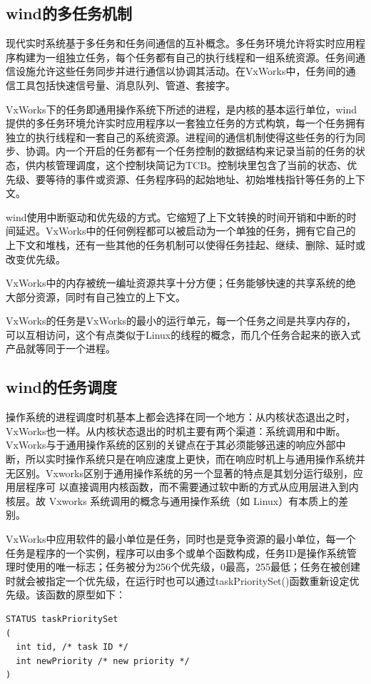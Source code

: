 \subsection{wind的多任务机制}
	现代实时系统基于多任务和任务间通信的互补概念。多任务环境允许将实时应用程序构建为一组独立任务，每个任务都有自己的执行线程和一组系统资源。任务间通信设施允许这些任务同步并进行通信以协调其活动。在VxWorks中，任务间的通信工具包括快速信号量、消息队列、管道、套接字。
	
	VxWorks下的任务即通用操作系统下所述的进程，是内核的基本运行单位，wind提供的多任务环境允许实时应用程序以一套独立任务的方式构筑，每一个任务拥有独立的执行线程和一套自己的系统资源。进程间的通信机制使得这些任务的行为同步、协调。内一个开启的任务都有一个任务控制的数据结构来记录当前的任务的状态，供内核管理调度，这个控制块简记为TCB。控制块里包含了当前的状态、优先级、要等待的事件或资源、任务程序码的起始地址、初始堆栈指针等任务的上下文。
	
	wind使用中断驱动和优先级的方式。它缩短了上下文转换的时间开销和中断的时间延迟。VxWorks中的任何例程都可以被启动为一个单独的任务，拥有它自己的上下文和堆栈，还有一些其他的任务机制可以使得任务挂起、继续、删除、延时或改变优先级。	

	VxWorks中的内存被统一编址资源共享十分方便；任务能够快速的共享系统的绝大部分资源，同时有自己独立的上下文。
	
	VxWorks的任务是VxWorks的最小的运行单元，每一个任务之间是共享内存的，可以互相访问，这个有点类似于Linux的线程的概念，而几个任务合起来的嵌入式产品就等同于一个进程。

\subsection{wind的任务调度}

	操作系统的进程调度时机基本上都会选择在同一个地方：从内核状态退出之时，VxWorks也一样。从内核状态退出的时机主要有两个渠道：系统调用和中断。	VxWorks与于通用操作系统的区别的关键点在于其必须能够迅速的响应外部中断，所以实时操作系统只是在响应速度上更快，而在响应时机上与通用操作系统并无区别。Vxworks区别于通用操作系统的另一个显著的特点是其划分运行级别，应用层程序可
以直接调用内核函数，而不需要通过软中断的方式从应用层进入到内核层。故 Vxworks 系统调用的概念与通用操作系统（如 Linux）有本质上的差别。
	
	
	VxWorks中应用软件的最小单位是任务，同时也是竞争资源的最小单位，每一个任务是程序的一个实例，程序可以由多个或单个函数构成，任务ID是操作系统管理时使用的唯一标志；任务被分为256个优先级，0最高，255最低；任务在被创建时就会被指定一个优先级，在运行时也可以通过taskPrioritySet()函数重新设定优先级。该函数的原型如下：
\lstset{language=C}
\begin{lstlisting}
STATUS taskPrioritySet
(
  int tid, /* task ID */
  int newPriority /* new priority */
) 
\end{lstlisting}
	
